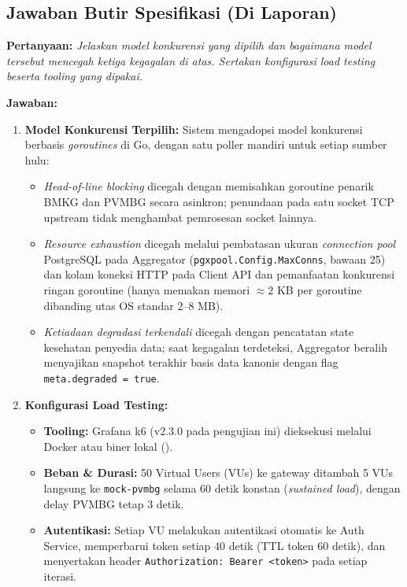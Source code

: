 \clearpage
\subsection{Jawaban Butir Spesifikasi (Di Laporan)}
\textbf{Pertanyaan:} \textit{Jelaskan model konkurensi yang dipilih dan bagaimana model tersebut mencegah ketiga kegagalan di atas. Sertakan konfigurasi load testing beserta tooling yang dipakai.}

\textbf{Jawaban:}
\begin{enumerate}
    \item \textbf{Model Konkurensi Terpilih:} Sistem mengadopsi model konkurensi berbasis \textit{goroutines} di Go, dengan satu poller mandiri untuk setiap sumber hulu:
    \begin{itemize}
        \item \textit{Head-of-line blocking} dicegah dengan memisahkan goroutine penarik BMKG dan PVMBG secara asinkron; penundaan pada satu socket TCP upstream tidak menghambat pemrosesan socket lainnya.
        \item \textit{Resource exhaustion} dicegah melalui pembatasan ukuran \textit{connection pool} PostgreSQL pada Aggregator (\texttt{pgxpool.Config.MaxConns}, bawaan 25) dan kolam koneksi HTTP pada Client API dan pemanfaatan konkurensi ringan goroutine (hanya memakan memori $\approx 2$ KB per goroutine dibanding utas OS standar 2--8 MB).
        \item \textit{Ketiadaan degradasi terkendali} dicegah dengan pencatatan state kesehatan penyedia data; saat kegagalan terdeteksi, Aggregator beralih menyajikan snapshot terakhir basis data kanonis dengan flag \texttt{meta.degraded = true}.
    \end{itemize}
    \item \textbf{Konfigurasi Load Testing:}
    \begin{itemize}
        \item \textbf{Tooling:} Grafana k6 (v2.3.0 pada pengujian ini) dieksekusi melalui Docker atau biner lokal ().
        \item \textbf{Beban \& Durasi:} 50 Virtual Users (VUs) ke gateway ditambah 5 VUs langsung ke \texttt{mock-pvmbg} selama 60 detik konstan (\textit{sustained load}), dengan delay PVMBG tetap 3 detik.
        \item \textbf{Autentikasi:} Setiap VU melakukan autentikasi otomatis ke Auth Service, memperbarui token setiap 40 detik (TTL token 60 detik), dan menyertakan header \texttt{Authorization: Bearer <token>} pada setiap iterasi.
    \end{itemize}
\end{enumerate}
